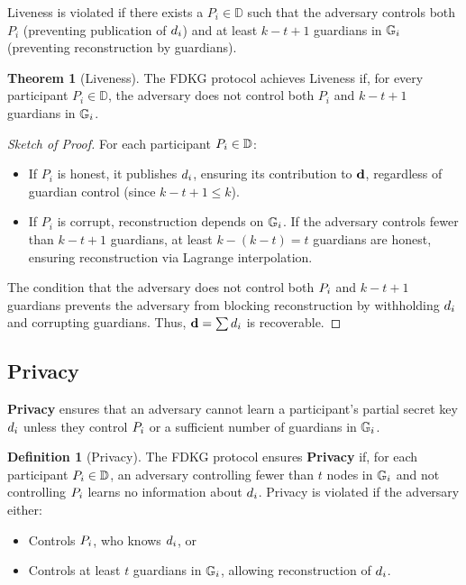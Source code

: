 \documentclass[lettersize,journal]{IEEEtran}
\theoremstyle{definition}
\newtheorem{definition}{Definition}
\newtheorem{theorem}{Theorem}
\begin{document}
Liveness is violated if there exists a \( P_i \in \mathbb{D} \) such that the adversary controls both \( P_i \) (preventing publication of \( d_{i} \)) and at least \( k - t + 1 \) guardians in \( \mathbb{G}_{i} \) (preventing reconstruction by guardians).

\begin{theorem}[Liveness]
\label{thm:liveness}
The FDKG protocol achieves Liveness if, for every participant \( P_i \in \mathbb{D} \), the adversary does not control both \( P_i \) and \( k - t + 1 \) guardians in \( \mathbb{G}_{i} \).
\end{theorem}

\begin{proof}[Sketch of Proof]
For each participant \(P_{i} \in \mathbb{D}\):
\begin{itemize}
    \item If \( P_i \) is honest, it publishes \( d_{i} \), ensuring its contribution to \( \textbf{d} \), regardless of guardian control (since \( k - t + 1 \leq k \)).  
    \item If \( P_i \) is corrupt, reconstruction depends on \( \mathbb{G}_{i} \). If the adversary controls fewer than \( k - t + 1 \) guardians, at least \( k - (k - t) = t \) guardians are honest, ensuring reconstruction via Lagrange interpolation.
\end{itemize}

The condition that the adversary does not control both \(P_{i}\) and \(k - t + 1\) guardians prevents the adversary from blocking reconstruction by withholding \(d_{i}\) and corrupting guardians. Thus, \(\textbf{d} = \sum d_{i}\) is recoverable.
\end{proof}

\subsection{Privacy}
\label{subsec:privacy}

\textbf{Privacy} ensures that an adversary cannot learn a participant's partial secret key \(d_{i}\) unless they control \(P_{i}\) or a sufficient number of guardians in \(\mathbb{G}_{i}\).

\begin{definition}[Privacy]
\label{def:privacy}
The FDKG protocol ensures \textbf{Privacy} if, for each participant \(P_{i} \in \mathbb{D}\), an adversary controlling fewer than \(t\) nodes in \(\mathbb{G}_{i}\) and not controlling \(P_{i}\) learns no information about \(d_{i}\). Privacy is violated if the adversary either:
\begin{itemize}
    \item Controls \(P_{i}\), who knows \(d_{i}\), or
    \item Controls at least \(t\) guardians in \(\mathbb{G}_{i}\), allowing reconstruction of \(d_{i}\).
\end{itemize}
\end{definition}
\end{document}
